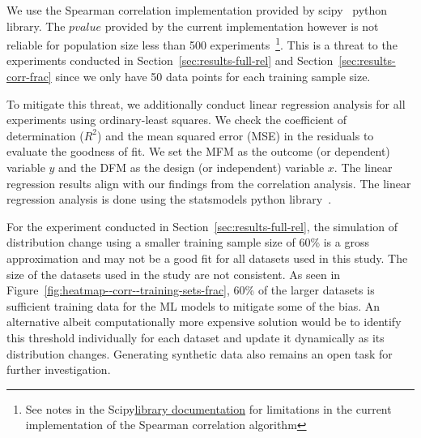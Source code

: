 \documentclass[conference]{IEEEtran}
\begin{document}
We use the Spearman correlation implementation provided by scipy~\cite{virtanen2020scipy} python library. The $pvalue$ provided by the current implementation however is not reliable for population size less than 500 experiments~\footnote{See notes in the Scipy\href{https://docs.scipy.org/doc/scipy/reference/generated/scipy.stats.spearmanr.html}{library documentation} for limitations in the current implementation of the Spearman correlation algorithm}. This is a threat to the experiments conducted in Section~\ref{sec:results-full-rel} and Section~\ref{sec:results-corr-frac} since we only have 50 data points for each training sample size.

To mitigate this threat, we additionally conduct linear regression
analysis for all experiments using ordinary-least squares. We check
the coefficient of determination ($R^2$) and the mean squared error
(MSE) in the residuals to evaluate the goodness of fit. We set the MFM
as the outcome (or dependent) variable $y$ and the DFM as the design
(or independent) variable $x$. The linear regression results align
with our findings from the correlation analysis. The linear regression
analysis is done using the statsmodels python
library \cite{seabold2010statsmodels}.



For the experiment conducted in Section \ref{sec:results-full-rel},
the simulation of distribution change using a smaller training sample
size of 60\% is a gross approximation and may not be a good fit for
all datasets used in this study. The size of the datasets used in the
study are not consistent. As seen in
Figure \ref{fig:heatmap--corr--training-sets-frac}, 60\% of the larger
datasets is sufficient training data for the ML
models to mitigate some of the bias. An alternative albeit
computationally more expensive solution would be to identify this
threshold individually for each dataset and update it dynamically as
its distribution changes. Generating synthetic data also remains an
open task for further investigation.
\end{document}
